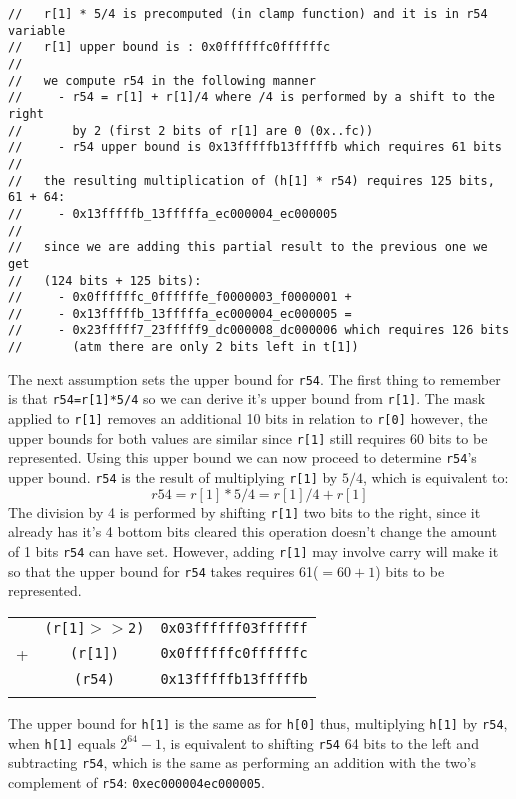 \documentclass{article}
\begin{document}
\begin{Verbatim}
//   r[1] * 5/4 is precomputed (in clamp function) and it is in r54 variable
//   r[1] upper bound is : 0x0ffffffc0ffffffc
//
//   we compute r54 in the following manner
//     - r54 = r[1] + r[1]/4 where /4 is performed by a shift to the right
//       by 2 (first 2 bits of r[1] are 0 (0x..fc))
//     - r54 upper bound is 0x13fffffb13fffffb which requires 61 bits
//
//   the resulting multiplication of (h[1] * r54) requires 125 bits, 61 + 64:
//     - 0x13fffffb_13fffffa_ec000004_ec000005
//
//   since we are adding this partial result to the previous one we get
//   (124 bits + 125 bits):
//     - 0x0ffffffc_0ffffffe_f0000003_f0000001 + 
//     - 0x13fffffb_13fffffa_ec000004_ec000005 =
//     - 0x23fffff7_23fffff9_dc000008_dc000006 which requires 126 bits
//       (atm there are only 2 bits left in t[1])
\end{Verbatim}
The next assumption sets the upper bound for \texttt{r54}. The first thing to remember is that \texttt{r54=r[1]*5/4} so we can derive it's upper bound from 
\texttt{r[1]}. The mask applied to \texttt{r[1]} removes an additional 10 bits in relation to \texttt{r[0]} however, the upper bounds for both values are
similar since \texttt{r[1]} still requires 60 bits to be represented. Using this upper bound we can now proceed to determine \texttt{r54}'s upper bound. 
\texttt{r54} is the result of multiplying \texttt{r[1]} by $5/4$, which is equivalent to:
$$r54 = r[1]*5/4 = r[1]/4 + r[1] $$
The division by 4 is performed by shifting \texttt{r[1]} two bits to the right, since it already has it's 4 bottom bits cleared this operation doesn't change 
the amount of 1 bits \texttt{r54} can have set. However, adding \texttt{r[1]} may involve carry will make it so that the upper bound for \texttt{r54} takes 
requires 61($=60+1$) bits to be represented.


\begin{tabular}{c c c}
\\
    &  \texttt{(r[1]$>>$2)}     &\texttt{0x03ffffff03ffffff} \\
+   &  \texttt{(r[1])}          &\texttt{0x0ffffffc0ffffffc} \\
\hline
    &  \texttt{(r54)}           &\texttt{0x13fffffb13fffffb} \\
\\
\end{tabular}

The upper bound for \texttt{h[1]} is the same as for \texttt{h[0]} thus, multiplying \texttt{h[1]} by \texttt{r54}, when \texttt{h[1]} equals $2^{64}-1$, 
is equivalent to shifting \texttt{r54} 64 bits to the left and subtracting \texttt{r54}, which is the same as performing an addition with the two's complement of 
\texttt{r54}: \texttt{0xec000004ec000005}.
\end{document}
